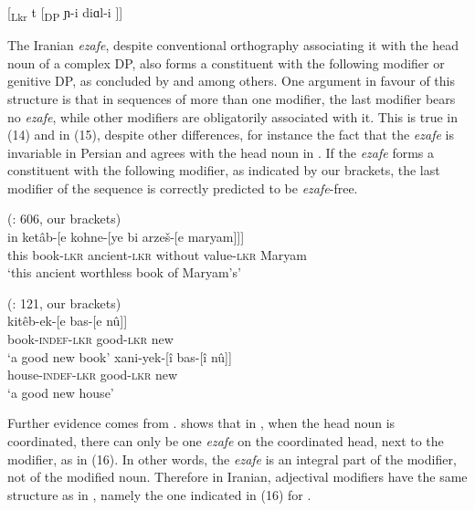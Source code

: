 \documentclass[output=paper]{langsci/langscibook}
\begin{document}
\ea%
    \label{ex:manzini:13}
    [\textsubscript{Lkr} t  [\textsubscript{DP} ɲ-i diɑl-i ]]     
\z

The Iranian \textit{ezafe}, despite conventional orthography associating it with the head noun of a complex DP, also forms a constituent with the following modifier  or genitive DP, as concluded by \citet{Larson2008} and \citet{Philip2012} among others. One argument in favour of this structure is that in sequences of more than one modifier, the last modifier bears no \textit{ezafe}, while other modifiers are obligatorily associated with it. This is true in  (14) and in   (15), despite other differences, for instance the fact that the \textit{ezafe} is invariable in Persian and agrees with the head noun in . If the \textit{ezafe} forms a constituent with the following modifier, as indicated by our brackets, the last modifier of the sequence is correctly predicted to be \textit{ezafe}{}-free. 

\ea%
          (\citealt{Samvelian2007}: 606, our brackets)\label{ex:manzini:14}\\
    \gll in   ketâb-[e   kohne-[ye   bi arzeš-[e     maryam]]]\\
         this   book{}-\textsc{lkr}    ancient{}-\textsc{lkr}    without value{}-\textsc{lkr}    Maryam\\
    \glt ‘this ancient worthless book of Maryam’s’     
    \z\pagebreak

  
\ea%
     (\citealt{Yamakido2005}: 121, our brackets)\label{ex:manzini:15}\\
    \ea
    \gll kitêb-ek-[e    bas-[e    nû]]\\
         book-\textsc{indef-lkr}   good-\textsc{lkr}   new\\
    \glt ‘a good new book’
    \ex  
    \gll xani-yek-[î    bas-[î    nû]]\\
         house-\textsc{indef-lkr}   good-\textsc{lkr}   new\\
    \glt ‘a good new house’
    \z
\z    

Further evidence comes from . \citet[37ff.]{Philip2012} shows that in , when the head noun is coordinated, there can only be one \textit{ezafe} on the coordinated head, next to the modifier, as in (16). In other words, the \textit{ezafe} is an integral part of the modifier, not of the modified noun. Therefore in Iranian, adjectival modifiers have the same structure as in , namely the one indicated in (16) for .
\end{document}
